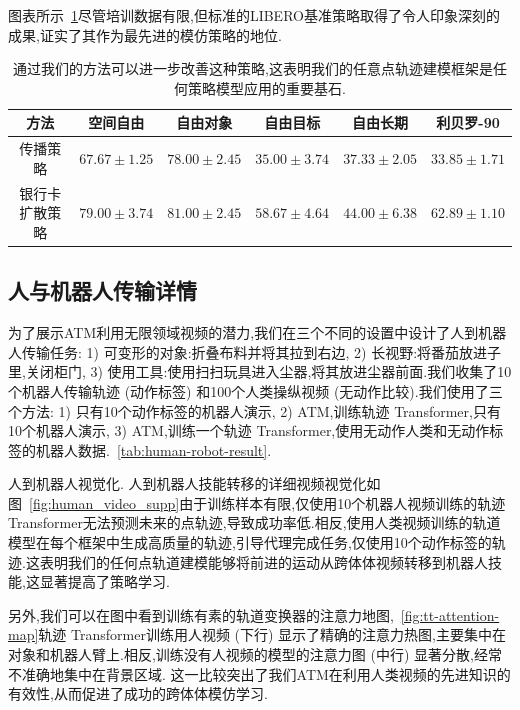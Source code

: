 \documentclass[conference]{IEEEtran}
\begin{document}
图表所示~\ref{tab:diff-policy}尽管培训数据有限,但标准的LIBERO基准策略取得了令人印象深刻的成果,证实了其作为最先进的模仿策略的地位.


\begin{table}[ht]
  \centering
  \caption{通过我们的方法可以进一步改善这种策略,这表明我们的任意点轨迹建模框架是任何策略模型应用的重要基石.}
  \begin{tabular}{@{}cccccc@{}}
    \toprule
    方法 & 空间自由 & 自由对象 & 自由目标 & 自由长期 & 利贝罗-90 \\
    \midrule
    传播策略 & $67.67\pm1.25$ & $78.00\pm2.45$ & $35.00\pm3.74$ & $37.33\pm2.05$  & $33.85\pm1.71$ \\
    银行卡扩散策略 & $79.00\pm3.74$ & $81.00\pm2.45$ & $58.67\pm4.64$ & $44.00\pm6.38$ & $62.89\pm1.10$ \\
    \bottomrule
  \end{tabular}
  \label{tab:diff-policy}
\end{table}


\subsection{人与机器人传输详情}
为了展示ATM利用无限领域视频的潜力,我们在三个不同的设置中设计了人到机器人传输任务: 1) 可变形的对象:折叠布料并将其拉到右边, 2) 长视野:将番茄放进子里,关闭柜门, 3) 使用工具:使用扫扫玩具进入尘器,将其放进尘器前面.我们收集了10个机器人传输轨迹 (动作标签) 和100个人类操纵视频 (无动作比较).我们使用了三个方法: 1) 只有10个动作标签的机器人演示, 2) ATM,训练轨迹 Transformer,只有10个机器人演示, 3) ATM,训练一个轨迹 Transformer,使用无动作人类和无动作标签的机器人数据.~\ref{tab:human-robot-result}.

人到机器人视觉化. 人到机器人技能转移的详细视频视觉化如图~\ref{fig:human_video_supp}由于训练样本有限,仅使用10个机器人视频训练的轨迹 Transformer无法预测未来的点轨迹,导致成功率低.相反,使用人类视频训练的轨道模型在每个框架中生成高质量的轨迹,引导代理完成任务,仅使用10个动作标签的轨迹.这表明我们的任何点轨道建模能够将前进的运动从跨体体视频转移到机器人技能,这显著提高了策略学习.

另外,我们可以在图中看到训练有素的轨道变换器的注意力地图,~\ref{fig:tt-attention-map}轨迹 Transformer训练用人视频 (下行) 显示了精确的注意力热图,主要集中在对象和机器人臂上.相反,训练没有人视频的模型的注意力图 (中行) 显著分散,经常不准确地集中在背景区域. 这一比较突出了我们ATM在利用人类视频的先进知识的有效性,从而促进了成功的跨体体模仿学习.
\end{document}
